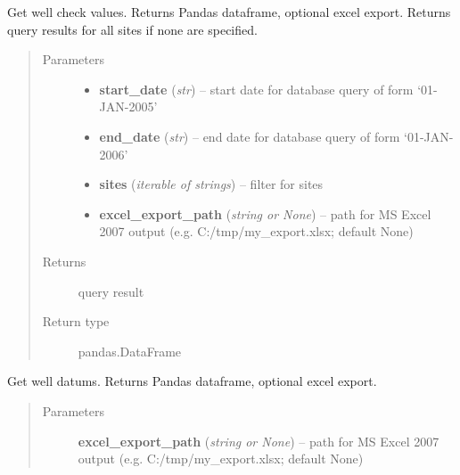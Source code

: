 \documentclass[letterpaper,10pt,english]{sphinxmanual}
\begin{document}
\begin{fulllineitems}
\begin{fulllineitems}
\label{modules:webb_utils.retrieve_data.RetrieveData.get_well_check_values}
Get well check values. Returns Pandas dataframe, optional excel export.
Returns query results for all sites if none are specified.
\begin{quote}\begin{description}
\item[{Parameters}] \leavevmode\begin{itemize}
\item {} 
\textbf{start\_date} (\emph{str}) -- start date for database query of form `01-JAN-2005'

\item {} 
\textbf{end\_date} (\emph{str}) -- end date for database query of form `01-JAN-2006'

\item {} 
\textbf{sites} (\emph{iterable of strings}) -- filter for sites

\item {} 
\textbf{excel\_export\_path} (\emph{string or None}) -- path for MS Excel 2007 output (e.g. C:/tmp/my\_export.xlsx; default None)

\end{itemize}

\item[{Returns}] \leavevmode
query result

\item[{Return type}] \leavevmode
pandas.DataFrame

\end{description}\end{quote}

\end{fulllineitems}


\begin{fulllineitems}
\label{modules:webb_utils.retrieve_data.RetrieveData.get_well_datums}
Get well datums. Returns Pandas dataframe, optional excel export.
\begin{quote}\begin{description}
\item[{Parameters}] \leavevmode
\textbf{excel\_export\_path} (\emph{string or None}) -- path for MS Excel 2007 output (e.g. C:/tmp/my\_export.xlsx; default None)


\end{description}
\end{quote}
\end{fulllineitems}
\end{fulllineitems}
\end{document}
